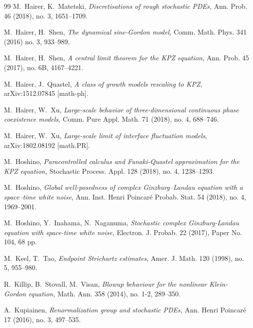 \documentclass[%
11pt,  reqno]{amsart}
\newcommand{\1}{\hspace{0.2mm}\text{I}\hspace{0.2mm}}
\numberwithin{equation}{section}
\numberwithin{theorem}{section}
\begin{document}
\begin{thebibliography}{99}
M.~Hairer,  K.~Matetski,
{\it Discretisations of rough stochastic {PDEs},}
Ann. Prob. 46 (2018), no. 3, 1651--1709.

M.~Hairer,  H.~Shen,
{\it The dynamical sine-{Gordon} model,}
Comm. Math. Phys. 341 (2016) no. 3, 933--989.




M.~Hairer, H.~Shen,
{\it A central limit theorem for the {KPZ} equation,}
Ann. Prob. 45 (2017), no. 6B, 4167--4221.


M.~Hairer, J.~Quastel,
{\it A class of growth models rescaling to KPZ,}
arXiv:1512.07845 [math-ph].

M.~Hairer, W.~Xu,
{\it Large-scale behavior of three-dimensional continuous phase
  coexistence models,}
 Comm. Pure Appl. Math.  71 (2018), no. 4, 688--746.

M.~Hairer, W.~Xu,
{\it Large-scale limit of interface fluctuation models,}
arXiv:1802.08192 [math.PR].



M.~Hoshino, {\it 
Paracontrolled calculus and Funaki-Quastel approximation for the KPZ equation,} Stochastic Process. Appl. 128 (2018), no. 4, 1238--1293. 


M.~Hoshino, {\it 
 Global well-posedness of complex Ginzburg--Landau equation with a space--time white noise}, 
 Ann. Inst. Henri Poincar\'e Probab. Stat. 54 (2018), no. 4, 1969--2001.



M.~Hoshino, Y.~Inahama, N.~Naganuma, {\it 
Stochastic complex Ginzburg-Landau equation with space-time white noise,}
 Electron. J. Probab. 22 (2017), Paper No. 104, 68 pp. 




M.~Keel, T.~Tao, {\it Endpoint Strichartz estimates},  Amer. J. Math. 120 (1998), no. 5, 955--980.


R.~Killip, B.~Stovall, M.~Visan, 
{\it Blowup behaviour for the nonlinear Klein-Gordon equation,} Math. Ann. 358 (2014), no. 1-2, 289--350.



A.~Kupiainen, 
{\it Renormalization group and stochastic PDEs,} Ann. Henri Poincar\'e 17 (2016), no. 3, 497--535. 


\end{thebibliography}
\end{document}
